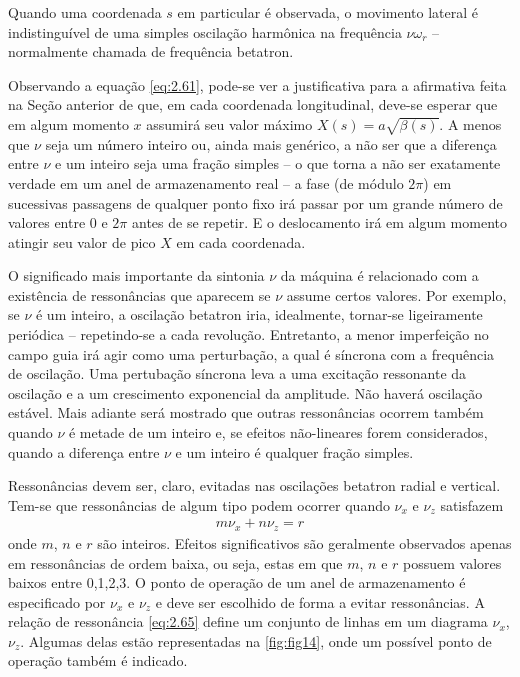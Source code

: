 Quando uma coordenada $s$ em particular é observada, o movimento lateral é indistinguível de uma simples oscilação harmônica na frequência $\nu \omega_r$ -- normalmente chamada de frequência betatron.

Observando a equação \eqref{eq:2.61}, pode-se ver a justificativa para a afirmativa feita na Seção anterior de que, em cada coordenada longitudinal, deve-se esperar que em algum momento $x$ assumirá seu valor máximo $X(s) = a\sqrt{\beta(s)}$. A menos que $\nu$ seja um número inteiro ou, ainda mais genérico, a não ser que a diferença entre $\nu$ e um inteiro seja uma fração simples -- o que torna a não ser exatamente verdade em um anel de armazenamento real -- a fase (de módulo $2\pi$) em sucessivas passagens de qualquer ponto fixo irá passar por um grande número de valores entre $0$ e $2\pi$ antes de se repetir. E o deslocamento irá em algum momento atingir seu valor de pico $X$ em cada coordenada.

O significado mais importante da sintonia $\nu$ da máquina é relacionado com a existência de ressonâncias que aparecem se $\nu$ assume certos valores. Por exemplo, se $\nu$ é um inteiro, a oscilação betatron iria, idealmente, tornar-se ligeiramente periódica -- repetindo-se a cada revolução. Entretanto, a menor imperfeição no campo guia irá agir como uma perturbação, a qual é síncrona com a frequência de oscilação. Uma pertubação síncrona leva a uma excitação ressonante da oscilação e a um crescimento exponencial da amplitude. Não haverá oscilação estável. Mais adiante será mostrado que outras ressonâncias ocorrem também quando $\nu$ é metade de um inteiro e, se efeitos não-lineares forem considerados, quando a diferença entre $\nu$ e um inteiro é qualquer fração simples.

Ressonâncias devem ser, claro, evitadas nas oscilações betatron radial e vertical. Tem-se que ressonâncias de algum tipo podem ocorrer quando $\nu_x$ e $\nu_z$ satisfazem
\begin{align}
	m \nu_x + n \nu_z = r\label{eq:2.65}
\end{align}
onde $m$, $n$ e $r$ são inteiros. Efeitos significativos são geralmente observados apenas em ressonâncias de ordem baixa, ou seja, estas em que $m$, $n$ e $r$ possuem valores baixos entre 0,1,2,3. O ponto de operação de um anel de armazenamento é especificado por $\nu_x$ e $\nu_z$ e deve ser escolhido de forma a evitar ressonâncias. A relação de ressonância \eqref{eq:2.65} define um conjunto de linhas em um diagrama $\nu_x$, $\nu_z$. Algumas delas estão representadas na \autoref{fig:fig14}, onde um possível ponto de operação também é indicado.

